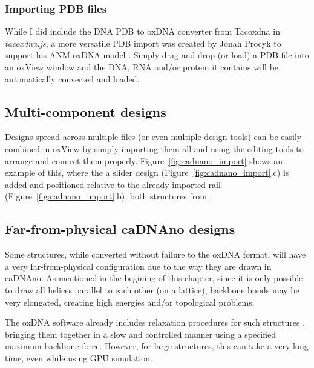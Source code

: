 \subsubsection{Importing PDB files}
While I did include the DNA PDB to oxDNA converter from Tacoxdna in \emph{tacoxdna.js}, a more versatile PDB import was created by Jonah Procyk to support his ANM-oxDNA model \cite{procyk2021coarse}. Simply drag and drop (or load) a PDB file into an oxView window and the DNA, RNA and/or protein it contains will be automatically converted and loaded.


\subsection{Multi-component designs}
Designs spread across multiple files (or even multiple design tools) can be easily combined in oxView by simply importing them all and using the editing tools to arrange and connect them properly. Figure~\ref{fig:cadnano_import} shows an example of this, where the a slider design (Figure~\ref{fig:cadnano_import}.c) is added and positioned relative to the already imported rail (Figure~\ref{fig:cadnano_import}.b), both structures from \cite{benson2021strategies}.

\subsection{Far-from-physical caDNAno designs}
Some structures, while converted without failure to the oxDNA format, will have a very far-from-physical configuration due to the way they are drawn in caDNAno. As mentioned in the begining of this chapter, since it is only possible to draw all helices parallel to each other (on a lattice), backbone bonds may be very elongated, creating high energies and/or topological problems.

The oxDNA software already includes relaxation procedures for such structures \cite{doye2020oxdna}, bringing them together in a slow and controlled manner using a specified maximum backbone force. However, for large structures, this can take a very long time, even while using GPU simulation.

